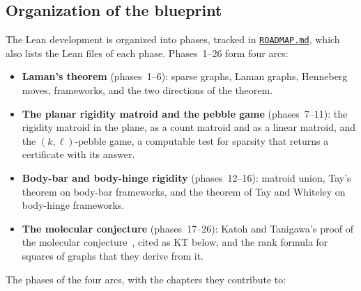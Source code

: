 \subsection*{Organization of the blueprint}

The Lean development is organized into phases, tracked in
\href{https://github.com/bryangingechen/CombinatorialRigidity/blob/master/ROADMAP.md}{\texttt{ROADMAP.md}},
which also lists the Lean files of each phase. Phases~1--26 form four
arcs:

\begin{itemize}
  \item \textbf{Laman's theorem} (phases~1--6): sparse graphs, Laman
        graphs, Henneberg moves, frameworks, and the two directions of
        the theorem.
  \item \textbf{The planar rigidity matroid and the pebble game}
        (phases~7--11): the rigidity matroid in the plane, as a count
        matroid and as a linear matroid, and the $(k,\ell)$-pebble game,
        a computable test for sparsity that returns a certificate with
        its answer.
  \item \textbf{Body-bar and body-hinge rigidity} (phases~12--16):
        matroid union, Tay's theorem on body-bar frameworks, and the
        theorem of Tay and Whiteley on body-hinge frameworks.
  \item \textbf{The molecular conjecture} (phases~17--26): Katoh and
        Tanigawa's proof of the molecular
        conjecture~\cite{katohTanigawa2011}, cited as KT below, and the
        rank formula for squares of graphs that they derive from it.
\end{itemize}

The phases of the four arcs, with the chapters they contribute to:

